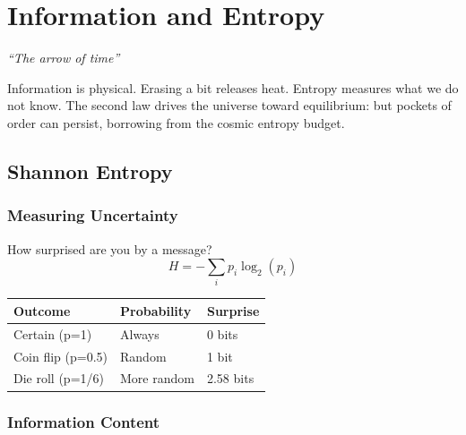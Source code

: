 \documentclass[
  11pt,
  letterpaper,
  twoside,
  openright]{book}
\begin{document}
\chapter{Information and Entropy}\label{sec-information-entropy}

\emph{``The arrow of time''}

\begin{tcolorbox}[enhanced jigsaw, leftrule=.75mm, title=\textcolor{quarto-callout-note-color}{\faInfo}\hspace{0.5em}{Key Revelation}, bottomrule=.15mm, opacityback=0, coltitle=black, arc=.35mm, colframe=quarto-callout-note-color-frame, colbacktitle=quarto-callout-note-color!10!white, colback=white, titlerule=0mm, breakable, bottomtitle=1mm, toptitle=1mm, rightrule=.15mm, toprule=.15mm, left=2mm, opacitybacktitle=0.6]

Information is physical. Erasing a bit releases heat. Entropy measures
what we do not know. The second law drives the universe toward
equilibrium: but pockets of order can persist, borrowing from the cosmic
entropy budget.

\end{tcolorbox}

\section{Shannon Entropy}\label{shannon-entropy}

\subsection{Measuring Uncertainty}\label{measuring-uncertainty}

How surprised are you by a message? \[
H = -\sum_i p_i \log_2(p_i)
\]

\begin{longtable}[]{@{}lll@{}}
\toprule\noalign{}
Outcome & Probability & Surprise \\
\midrule\noalign{}
\endhead
\bottomrule\noalign{}
\endlastfoot
Certain (p=1) & Always & 0 bits \\
Coin flip (p=0.5) & Random & 1 bit \\
Die roll (p=1/6) & More random & 2.58 bits \\
\end{longtable}

\subsection{Information Content}\label{information-content-1}
\end{document}
